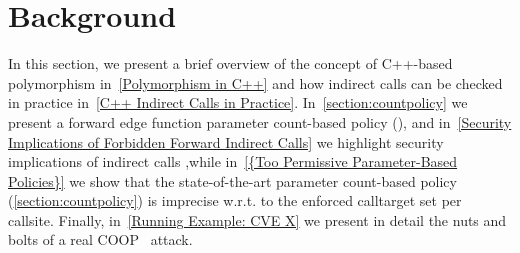 \section{Background}
\label{C++ Bad Forward Indirect Calls}
In this section,
we present a brief overview of the concept of C++-based polymorphism in~\cref{Polymorphism in C++}
and how indirect calls can be checked in practice in~\cref{C++ Indirect Calls in Practice}.
In~\cref{section:countpolicy} we present a forward edge function parameter count-based policy (\cite{veen:typearmor}), and
in~\cref{Security Implications of Forbidden Forward Indirect Calls} we highlight security implications of indirect calls ,while
in~\cref{{Too Permissive Parameter-Based Policies}} we show that the state-of-the-art parameter count-based policy
(\cref{section:countpolicy}) is imprecise w.r.t. to the enforced calltarget set per callsite. 
Finally, in~\cref{Running Example: CVE X} we present in detail the nuts and bolts of a real COOP~\cite{schuster:coop} attack.

